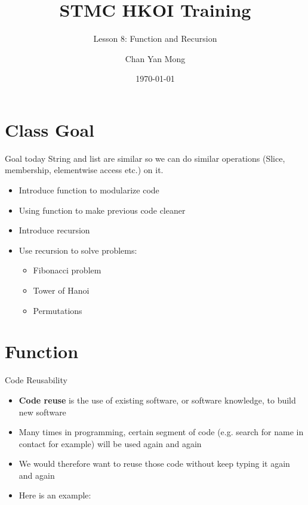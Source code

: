 \documentclass[10pt,xcolor={table,dvipsnames},t]{beamer}
\title[Your Short Title]{STMC HKOI Training}
\subtitle{Lesson 8: Function and Recursion}
\author{Chan Yan Mong}
\date{\today}
\begin{document}
\begin{frame}
  \titlepage
\end{frame}


\section{Class Goal}

\begin{frame}{Goal today}
String and list are similar so we can do similar operations (Slice, membership, elementwise access etc.) on it. 
\begin{itemize}
  \item Introduce function to modularize code
  \item Using function to make previous code cleaner
  \item Introduce recursion
  \item Use recursion to solve problems:
  \begin{itemize}
    \item Fibonacci problem
    \item Tower of Hanoi
    \item Permutations
  \end{itemize}
\end{itemize}

\end{frame}

\section{Function}
\begin{frame}[fragile]{Code Reusability}
  \begin{itemize}
    \item \textbf{Code reuse} is the use of existing software, or software knowledge, to build new software 
    \item Many times in programming, certain segment of code (e.g. search for name in contact for example) will be used again and again 
    \item We would therefore want to reuse those code without keep typing it again and again 
    \item Here is an example:
  \end{itemize}
\end{frame}
\end{document}

